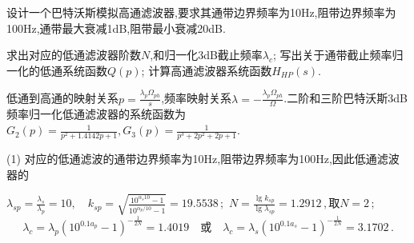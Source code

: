 \documentclass[list,answers,csize4,custom]{sysuexam}
\begin{document}
\begin{groups}
\begin{questions}[rs]
\begin{solution}
\begin{center}
        \end{center}
    \end{solution}
\end{questions}

\begin{questions}[rst]
    \question[10] 设计一个巴特沃斯模拟高通滤波器,要求其通带边界频率为10Hz,阻带边界频率为100Hz,通带最大衰减1dB,阻带最小衰减20dB.
    \begin{subquestions}
        \subquestion[3] 求出对应的低通滤波器阶数$N$,和归一化3dB截止频率$\lambda_c$;
        \subquestion[3] 写出关于通带截止频率归一化的低通系统函数$Q(p)$;
        \subquestion[4] 计算高通滤波器系统函数$H_{HP}(s)$.
    \end{subquestions}
    \hint 低通到高通的映射关系$p=\frac{\lambda_{p}\Omega_{ph}}{s}$,频率映射关系$\lambda=-\frac{\lambda_{p}\Omega_{ph}}{\Omega}$.二阶和三阶巴特沃斯3dB频率归一化低通滤波器的系统函数为$G_{2}(p)=\frac{1}{p^{2}+1.4142 p+1}, G_{3}(p)=\frac{1}{p^{3}+2 p^{2}+2 p+1}$.
    \begin{solution}
        \answers (1) 对应的低通滤波的通带边界频率为10Hz,阻带边界频率为100Hz,因此低通滤波器的\par
        $\lambda_{s p}=\frac{\lambda_{s}}{\lambda_{p}}=10, \quad k_{s p}=\sqrt{\frac{10^{\alpha_{s} 10}-1}{10^{\alpha_{p} / 10}-1}}=19.5538\,;$
        $N=\frac{\lg k_{s p}}{\lg \lambda_{s p}}=1.2912\,, 取N=2\,;$
        $$\lambda_{c}=\lambda_{p}\left(10^{0.1 a_{p}}-1\right)^{-\frac{1}{2 N}}=1.4019\quad 或\quad \lambda_{c}=\lambda_{s}\left(10^{0.1 a_{s}}-1\right)^{-\frac{1}{2 N}}=3.1702\,.$$


\end{solution}
\end{questions}
\end{groups}
\end{document}
